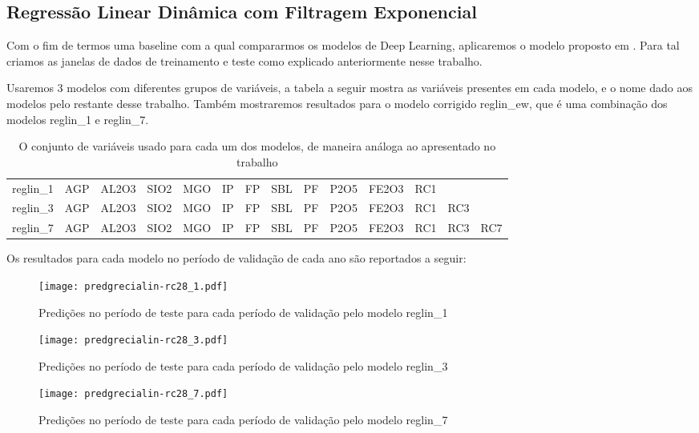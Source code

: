 \subsection{Regressão Linear Dinâmica com Filtragem Exponencial}

Com o fim de termos uma baseline com a qual compararmos os modelos de Deep
Learning, aplicaremos o modelo proposto em \citep{grecialin}.
Para tal criamos as janelas de dados de treinamento e teste
como explicado anteriormente nesse trabalho.  

Usaremos 3 modelos com diferentes grupos de variáveis, a tabela a seguir mostra
as variáveis presentes em cada modelo, e o nome dado aos modelos pelo restante
desse trabalho. Também mostraremos resultados para o modelo corrigido
reglin\_ew, que é uma combinação dos modelos reglin\_1 e reglin\_7.


\begin{table}[]
\centering 
\begin{tabular}{llllllllllllll}
\toprule
reglin\_1 &  AGP &  AL2O3 &  SIO2 &  MGO &  IP &  FP &  SBL &  PF &  P2O5 &  FE2O3 &  RC1 &      &      \\
reglin\_3 &  AGP &  AL2O3 &  SIO2 &  MGO &  IP &  FP &  SBL &  PF &  P2O5 &  FE2O3 &  RC1 &  RC3 &      \\
reglin\_7 &  AGP &  AL2O3 &  SIO2 &  MGO &  IP &  FP &  SBL &  PF &  P2O5 &  FE2O3 &  RC1 &  RC3 &  RC7 \\
\bottomrule
\end{tabular}
\caption{O conjunto de variáveis usado para cada um dos modelos, de maneira análoga ao apresentado no trabalho \cite{grecialin}}
\label{tab:modelslin}
\end{table}

Os resultados para cada modelo no período de validação de cada ano são reportados a seguir:

\begin{figure}[H]
  \centering
  \texttt{[image: predgrecialin-rc28\_1.pdf]}
  \caption{Predições no período de teste para cada período de validação pelo
    modelo reglin\_1}
  \label{fig:rc281preds}
\end{figure}

\begin{figure}[H]
  \centering
  \texttt{[image: predgrecialin-rc28\_3.pdf]}
  \caption{Predições no período de teste para cada período de validação pelo
    modelo reglin\_3}
  \label{fig:rc281preds}

\end{figure}
\begin{figure}[H]
  \centering
  \texttt{[image: predgrecialin-rc28\_7.pdf]}
  \caption{Predições no período de teste para cada período de validação pelo
    modelo reglin\_7}
  \label{fig:rc281preds}

\end{figure}

